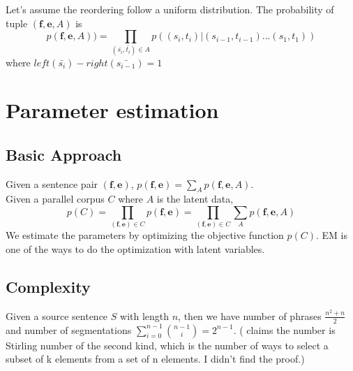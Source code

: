 \documentclass[11pt, letterpaper]{article}   	%
\begin{document}
\begin{itemize}
Let's assume the reordering follow a uniform distribution.
The probability of tuple $(\textbf{f},\textbf{e},A)$ is 
\begin{equation} \label{eq:obj2}
p(\textbf{f},\textbf{e},A))=\prod_{(\bar{s_i},\bar{t_i}) \in A} p((s_i,t_i)| (s_{i-1},t_{i-1}) ... (s_{1},t_{1}))
\end{equation}
where $left(\bar{s_i})- right(\bar{s_{i-1}})=1$

\end{itemize}

\section{Parameter estimation}
\subsection{Basic Approach}
Given a sentence pair $(\textbf{f},\textbf{e})$, $p(\textbf{f},\textbf{e})=\sum_{A}p(\textbf{f},\textbf{e},A)$.\\
Given a parallel corpus $C$ where $A$ is the latent data, 
\begin{equation}p(C)=\prod_{(\textbf{f},\textbf{e}) \in C} p(\textbf{f},\textbf{e})=\prod_{(\textbf{f},\textbf{e}) \in C} \sum_{A} p(\textbf{f},\textbf{e},A) \end{equation}
We estimate the parameters by optimizing the objective function $p(C)$. EM is one of the ways to do the optimization with latent variables.

\subsection{Complexity}
Given a source sentence $S$ with length $n$, then we have number of phrases $\frac{n^2+n}{2}$ and number of segmentations $\sum\limits_{i=0}^{n-1} {n-1 \choose i} = 2^{n-1}$. (\cite{marcu-wong-02} claims the number is Stirling number of the second kind, which is the number of ways to select a subset of k elements from a set of n elements. I didn't find the proof.)
\end{document}
